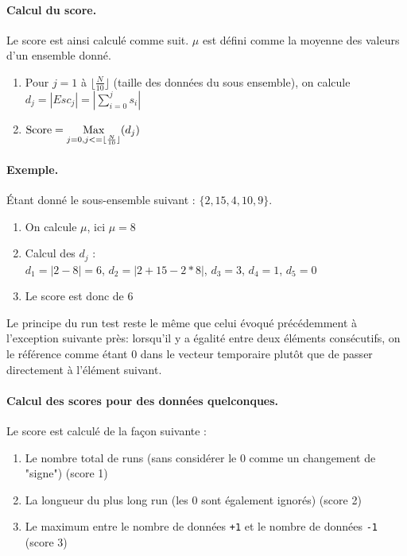 \paragraph{Calcul du score.\\}
Le score est ainsi calculé comme suit. $\mu$ est défini comme la moyenne des valeurs d'un ensemble donné.
\begin{enumerate}
\item Pour $j=1$ à $ \lfloor\frac{N}{10}\rfloor$ (taille des données du sous ensemble), on calcule $d_j=|Esc_j| = |\sum\limits_{i=0}^{j} s_i|$
\item $\text{Score} = \operatorname*{Max}\limits_{j=0,j<=\lfloor\frac{N}{10}\rfloor} (d_j)$
\end{enumerate}

\paragraph{Exemple.\\}
Étant donné le sous-ensemble suivant : $ \lbrace 2, 15, 4, 10, 9 \rbrace$. 
\begin{enumerate}
\item On calcule $\mu$, ici $\mu=8$
\item Calcul des $d_j$ :\\
$d_1=|2-8|=6$, $d_2=|2+15-2*8|$, $d_3=3$, $d_4=1$, $d_5=0$
\item Le score est donc de $6$\\
\end{enumerate}

Le principe du run test reste le même que celui évoqué précédemment à l'exception suivante près: lorsqu'il y a égalité entre deux éléments consécutifs, on le référence comme étant 0 dans le vecteur temporaire plutôt que de passer directement à l'élément suivant. 

\paragraph{Calcul des scores pour des données quelconques.\\}
Le score est calculé de la façon suivante : 
\begin{enumerate}
\item Le nombre total de runs (sans considérer le 0 comme un changement de "signe") (score 1)
\item La longueur du plus long run (les 0 sont également ignorés) (score 2)
\item Le maximum entre le nombre de données \texttt{+1} et le nombre de données \texttt{-1} (score 3)\\

\end{enumerate}


